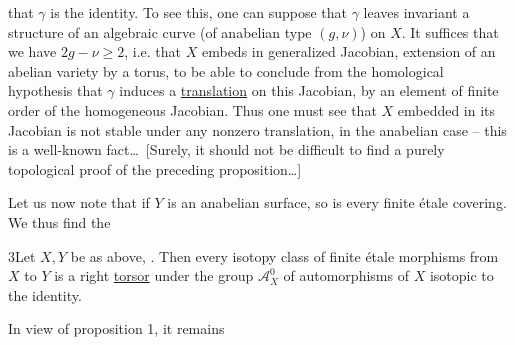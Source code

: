 that $\gamma$ is the identity. To see this, one can suppose that $\gamma$ leaves invariant a structure  of an algebraic curve (of anabelian type $(g,\nu)$) on $X$. It suffices  that we have $2g-\nu\geq2$, i.e. that $X$ embeds in  generalized Jacobian, extension of an abelian variety by a torus, to be able to conclude from the homological hypothesis that $\gamma$  induces a \uline{translation} on this Jacobian, by an element of finite order of the homogeneous Jacobian. Thus one must see that $X$ embedded in its Jacobian is not stable under any  nonzero translation, in the anabelian case -- this is a well-known fact\ldots\ [Surely, it should not be difficult to find a purely topological proof of the preceding proposition\ldots]

Let us now note that if $Y$ is an anabelian  surface, so is every finite étale covering. We thus find the

  3\quad Let $X,Y$ be  as above, .
Then every isotopy class of finite étale morphisms from $X$ to $Y$ is a right \uline{torsor} under the group $\mathcal{A}_X^0$ of automorphisms of $X$ isotopic to the identity.

In view of proposition 1, it remains
